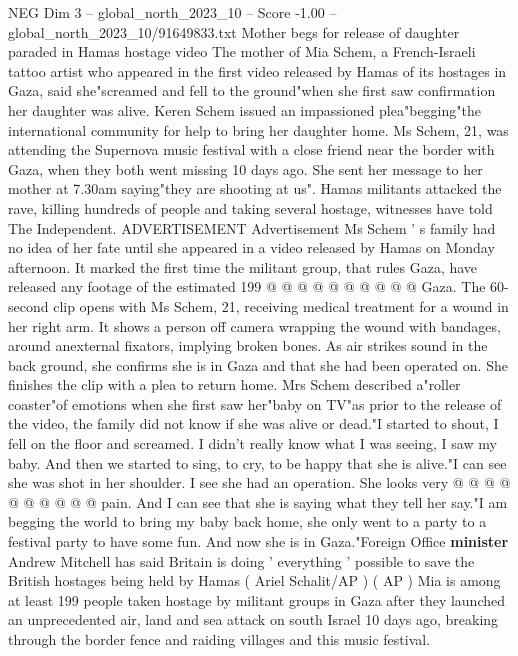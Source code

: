 \begin{textsample}{NEG Dim 3 – global\_north\_2023\_10 – Score -1.00 – global\_north\_2023\_10/91649833.txt}  \label{ex:f3_neg_257}
Mother begs for release of daughter paraded in Hamas hostage video The mother of Mia Schem, a French-Israeli tattoo artist who appeared in the first video released by Hamas of its hostages in Gaza, said she"screamed and fell to the ground"when she first saw confirmation her daughter was alive.
Keren Schem issued an impassioned plea"begging"the international community for help to bring her daughter home.
Ms Schem, 21, was attending the Supernova music festival with a close friend near the border with Gaza, when they both went missing 10 days ago.
She sent her message to her mother at 7.30am saying"they are shooting at us".
Hamas militants attacked the rave, killing hundreds of people and taking several hostage, witnesses have told The Independent.
ADVERTISEMENT Advertisement Ms Schem ' s family had no idea of her fate until she appeared in a video released by Hamas on Monday afternoon.
It marked the first time the militant group, that rules Gaza, have released any footage of the estimated 199 @ @ @ @ @ @ @ @ @ @ Gaza.
The 60-second clip opens with Ms Schem, 21, receiving medical treatment for a wound in her right arm.
It shows a person off camera wrapping the wound with bandages, around anexternal fixators, implying broken bones.
As air strikes sound in the back ground, she confirms she is in Gaza and that she had been operated on.
She finishes the clip with a plea to return home.
Mrs Schem described a"roller coaster"of emotions when she first saw her"baby on TV"as prior to the release of the video, the family did not know if she was alive or dead."I started to shout, I fell on the floor and screamed.
I didn't really know what I was seeing, I saw my baby.
And then we started to sing, to cry, to be happy that she is alive."I can see she was shot in her shoulder.
I see she had an operation.
She looks very @ @ @ @ @ @ @ @ @ @ pain.
And I can see that she is saying what they tell her say."I am begging the world to bring my baby back home, she only went to a party to a festival party to have some fun.
And now she is in Gaza."Foreign Office \textbf{minister} Andrew Mitchell has said Britain is doing ' everything ' possible to save the British hostages being held by Hamas ( Ariel Schalit/AP ) ( AP ) Mia is among at least 199 people taken hostage by militant groups in Gaza after they launched an unprecedented air, land and sea attack on south Israel 10 days ago, breaking through the border fence and raiding villages and this music festival.

\end{textsample}
